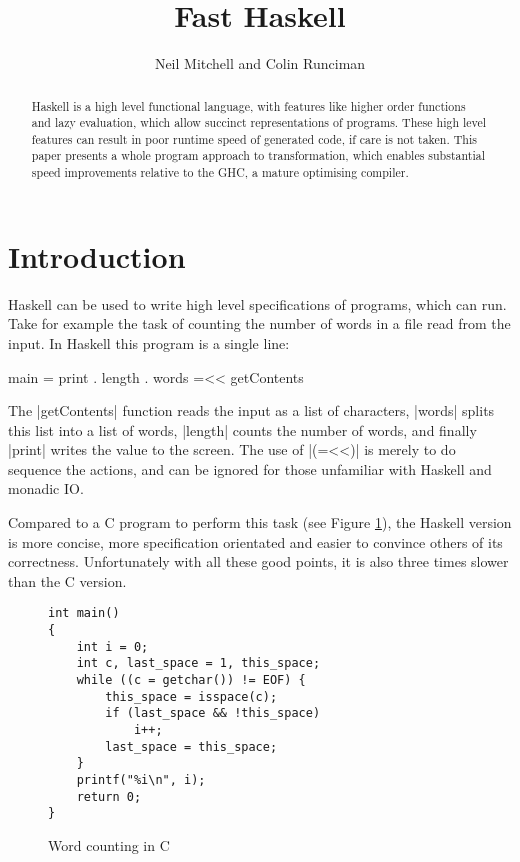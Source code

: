 \documentclass{llncs}
\begin{document}
\title{Fast Haskell}

\author{Neil Mitchell and Colin Runciman}


\maketitle              %

\begin{abstract}
Haskell is a high level functional language, with features like higher order functions and lazy evaluation, which allow succinct representations of programs. These high level features can result in poor runtime speed of generated code, if care is not taken. This paper presents a whole program approach to transformation, which enables substantial speed improvements relative to the GHC, a mature optimising compiler.
\end{abstract}

\section{Introduction}

Haskell can be used to write high level specifications of programs, which can run. Take for example the task of counting the number of words in a file read from the input. In Haskell this program is a single line:

\begin{code}
main = print . length . words =<< getContents
\end{code}

The |getContents| function reads the input as a list of characters, |words| splits this list into a list of words, |length| counts the number of words, and finally |print| writes the value to the screen. The use of |(=<<)| is merely to do sequence the actions, and can be ignored for those unfamiliar with Haskell and monadic IO.

Compared to a C program to perform this task (see Figure \ref{fig:c_words}), the Haskell version is more concise, more specification orientated and easier to convince others of its correctness. Unfortunately with all these good points,  it is also three times slower than the C version.

\begin{figure}[tb]
\begin{verbatim}
int main()
{
	int i = 0;
	int c, last_space = 1, this_space;
	while ((c = getchar()) != EOF) {
		this_space = isspace(c);
		if (last_space && !this_space)
			i++;
		last_space = this_space;
	}
	printf("%i\n", i);
	return 0;
}
\end{verbatim}
\caption{Word counting in C}
\label{fig:c_words}
\end{figure}
\end{document}
